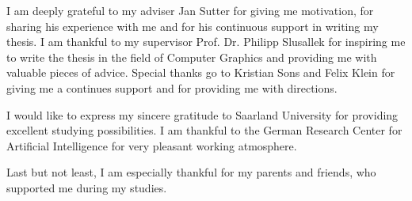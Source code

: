 

I am deeply grateful to my adviser Jan Sutter for giving me motivation, for sharing his experience with me and for his continuous support in writing my thesis.
I am thankful to my supervisor Prof. Dr. Philipp Slusallek for inspiring me to write the thesis in the field of Computer Graphics and providing me with valuable pieces of advice.
Special thanks go to Kristian Sons and Felix Klein for giving me a continues support and for providing me with directions.

I would like to express my sincere gratitude to Saarland University for providing excellent studying possibilities. 
I am thankful to the German Research Center for Artificial Intelligence for very pleasant working atmosphere.

 Last but not least, I am especially thankful for my parents and friends, who supported me during my studies.





